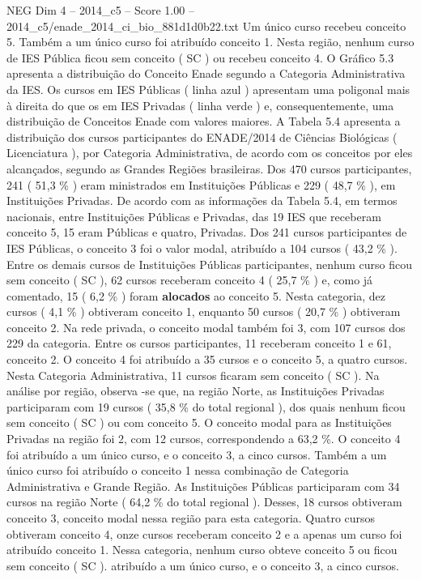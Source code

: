 \begin{textsample}{NEG Dim 4 – 2014\_c5 – Score 1.00 – 2014\_c5/enade\_2014\_ci\_bio\_881d1d0b22.txt}
Um único curso recebeu conceito 5.
Também a um único curso foi atribuído conceito 1.
Nesta região, nenhum curso de IES Pública ficou sem conceito ( SC ) ou recebeu conceito 4.
O Gráfico 5.3 apresenta a distribuição do Conceito Enade segundo a Categoria Administrativa da IES.
Os cursos em IES Públicas ( linha azul ) apresentam uma poligonal mais à direita do que os em IES Privadas ( linha verde ) e, consequentemente, uma distribuição de Conceitos Enade com valores maiores.
A Tabela 5.4 apresenta a distribuição dos cursos participantes do ENADE/2014 de Ciências Biológicas ( Licenciatura ), por Categoria Administrativa, de acordo com os conceitos por eles alcançados, segundo as Grandes Regiões brasileiras.
Dos 470 cursos participantes, 241 ( 51,3 \% ) eram ministrados em Instituições Públicas e 229 ( 48,7 \% ), em Instituições Privadas.
De acordo com as informações da Tabela 5.4, em termos nacionais, entre Instituições Públicas e Privadas, das 19 IES que receberam conceito 5, 15 eram Públicas e quatro, Privadas.
Dos 241 cursos participantes de IES Públicas, o conceito 3 foi o valor modal, atribuído a 104 cursos ( 43,2 \% ).
Entre os demais cursos de Instituições Públicas participantes, nenhum curso ficou sem conceito ( SC ), 62 cursos receberam conceito 4 ( 25,7 \% ) e, como já comentado, 15 ( 6,2 \% ) foram \textbf{alocados} ao conceito 5.
Nesta categoria, dez cursos ( 4,1 \% ) obtiveram conceito 1, enquanto 50 cursos ( 20,7 \% ) obtiveram conceito 2.
Na rede privada, o conceito modal também foi 3, com 107 cursos dos 229 da categoria.
Entre os cursos participantes, 11 receberam conceito 1 e 61, conceito 2.
O conceito 4 foi atribuído a 35 cursos e o conceito 5, a quatro cursos.
Nesta Categoria Administrativa, 11 cursos ficaram sem conceito ( SC ).
Na análise por região, observa -se que, na região Norte, as Instituições Privadas participaram com 19 cursos ( 35,8 \% do total regional ), dos quais nenhum ficou sem conceito ( SC ) ou com conceito 5.
O conceito modal para as Instituições Privadas na região foi 2, com 12 cursos, correspondendo a 63,2 \%.
O conceito 4 foi atribuído a um único curso, e o conceito 3, a cinco cursos.
Também a um único curso foi atribuído o conceito 1 nessa combinação de Categoria Administrativa e Grande Região.
As Instituições Públicas participaram com 34 cursos na região Norte ( 64,2 \% do total regional ).
Desses, 18 cursos obtiveram conceito 3, conceito modal nessa região para esta categoria.
Quatro cursos obtiveram conceito 4, onze cursos receberam conceito 2 e a apenas um curso foi atribuído conceito 1.
Nessa categoria, nenhum curso obteve conceito 5 ou ficou sem conceito ( SC ). atribuído a um único curso, e o conceito 3, a cinco cursos.

\end{textsample}
